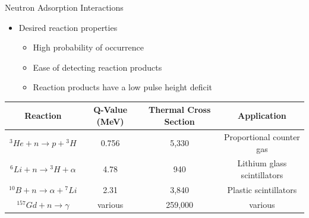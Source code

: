 \begin{frame}{Neutron Adsorption Interactions}
\begin{itemize}
	\item Desired reaction properties
	\begin{itemize}
		\item High probability of occurrence
		\item Ease of detecting reaction products
		\item Reaction products have a low pulse height deficit
	\end{itemize}
\end{itemize}
\begin{table}
	\small
	\begin{tabular}{ c | c c c} 
		Reaction                           & Q-Value (MeV) & Thermal Cross Section & Application \\
		\hline
		\hline
		${}^3He + n \to p +{}^3H$          & 0.756     & 5,330 & Proportional counter gas \\
		${}^6Li + n \to {}^3H + \alpha$    & 4.78      & 940 & Lithium glass scintillators \\
		${}^{10}B + n \to \alpha + {}^7Li$ & 2.31      & 3,840 & Plastic scintillators \\
		${}^{157}Gd + n \to \gamma$        &various    & 259,000 & various \\
	\end{tabular}
\end{table}
\end{frame}

